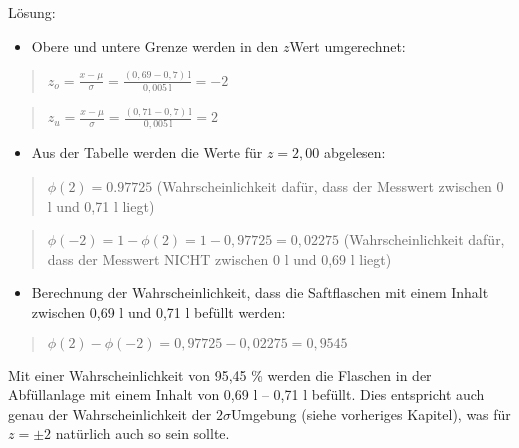 \documentclass[letterpaper,10pt,english]{jupyterBook}
\begin{document}
\sphinxAtStartPar
Lösung:
\begin{itemize}
\item {} 
\sphinxAtStartPar
Obere und untere Grenze werden in den \(z\)\sphinxhyphen{}Wert umgerechnet:

\end{itemize}
\begin{quote}

\sphinxAtStartPar
\(z_o = \frac{x-\mu}{\sigma} = \frac{(0,69-0,7)\,\mathrm l}{0,005\,\mathrm l} = -2\)
\end{quote}
\begin{quote}

\sphinxAtStartPar
\(z_u = \frac{x-\mu}{\sigma} = \frac{(0,71-0,7)\,\mathrm l}{0,005\,\mathrm l} = 2\)
\end{quote}
\begin{itemize}
\item {} 
\sphinxAtStartPar
Aus der Tabelle werden die Werte für \(z = 2,00\) abgelesen:

\end{itemize}
\begin{quote}

\sphinxAtStartPar
\(\phi(2) = 0.97725\) (Wahrscheinlichkeit dafür, dass der Messwert zwischen 0 l und 0,71 l liegt)
\end{quote}
\begin{quote}

\sphinxAtStartPar
\(\phi(-2) = 1 - \phi(2) =  1-0,97725 = 0,02275\) (Wahrscheinlichkeit dafür, dass der Messwert NICHT zwischen 0 l und 0,69 l liegt)
\end{quote}
\begin{itemize}
\item {} 
\sphinxAtStartPar
Berechnung der Wahrscheinlichkeit, dass die Saftflaschen mit einem Inhalt zwischen 0,69 l und 0,71 l befüllt werden:

\end{itemize}
\begin{quote}

\sphinxAtStartPar
\(\phi(2) - \phi(-2) = 0,97725-0,02275 = 0,9545\)
\end{quote}

\sphinxAtStartPar
Mit einer Wahrscheinlichkeit von 95,45 \% werden die Flaschen in der Abfüllanlage mit einem Inhalt von 0,69 l – 0,71 l befüllt. Dies entspricht auch genau der Wahrscheinlichkeit der \(2\sigma\)\sphinxhyphen{}Umgebung (siehe vorheriges Kapitel), was für \(z = \pm 2\) natürlich auch so sein sollte.
\end{document}
